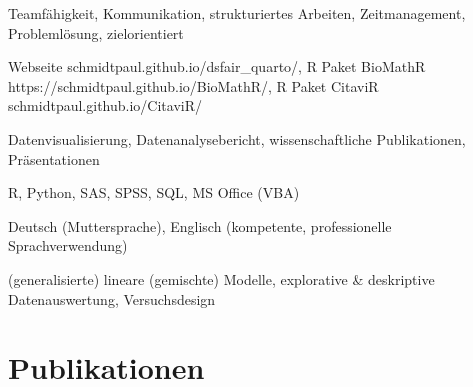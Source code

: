 \documentclass[11pt,a4paper,]{awesome-cv}
\begin{document}
\begin{cvskills} 
{Teamfähigkeit, Kommunikation, strukturiertes Arbeiten, Zeitmanagement, Problemlösung, zielorientiert} 

{Webseite schmidtpaul.github.io/dsfair\_quarto/, R Paket BioMathR https://schmidtpaul.github.io/BioMathR/, R Paket CitaviR schmidtpaul.github.io/CitaviR/} 

{Datenvisualisierung, Datenanalysebericht, wissenschaftliche Publikationen, Präsentationen} 

{R, Python, SAS, SPSS, SQL, MS Office (VBA)} 

{Deutsch (Muttersprache), Englisch (kompetente, professionelle Sprachverwendung)} 

{(generalisierte) lineare (gemischte) Modelle, explorative \& deskriptive Datenauswertung, Versuchsdesign} 
\end{cvskills}

\section{Publikationen}\label{publikationen-1}

\footnotesize
\end{document}
